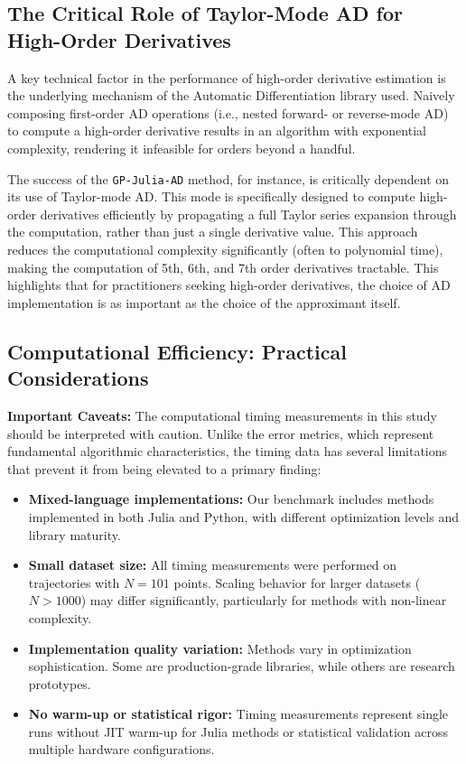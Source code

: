 \subsection{The Critical Role of Taylor-Mode AD for High-Order Derivatives}
A key technical factor in the performance of high-order derivative estimation is the underlying mechanism of the Automatic Differentiation library used. Naively composing first-order AD operations (i.e., nested forward- or reverse-mode AD) to compute a high-order derivative results in an algorithm with exponential complexity, rendering it infeasible for orders beyond a handful.

The success of the \texttt{GP-Julia-AD} method, for instance, is critically dependent on its use of Taylor-mode AD. This mode is specifically designed to compute high-order derivatives efficiently by propagating a full Taylor series expansion through the computation, rather than just a single derivative value. This approach reduces the computational complexity significantly (often to polynomial time), making the computation of 5th, 6th, and 7th order derivatives tractable. This highlights that for practitioners seeking high-order derivatives, the choice of AD implementation is as important as the choice of the approximant itself.

\subsection{Computational Efficiency: Practical Considerations}
\label{sec:efficiency}

\textbf{Important Caveats:} The computational timing measurements in this study should be interpreted with caution. Unlike the error metrics, which represent fundamental algorithmic characteristics, the timing data has several limitations that prevent it from being elevated to a primary finding:

\begin{itemize}
    \item \textbf{Mixed-language implementations:} Our benchmark includes methods implemented in both Julia and Python, with different optimization levels and library maturity.
    \item \textbf{Small dataset size:} All timing measurements were performed on trajectories with $N=101$ points. Scaling behavior for larger datasets ($N > 1000$) may differ significantly, particularly for methods with non-linear complexity.
    \item \textbf{Implementation quality variation:} Methods vary in optimization sophistication. Some are production-grade libraries, while others are research prototypes.
    \item \textbf{No warm-up or statistical rigor:} Timing measurements represent single runs without JIT warm-up for Julia methods or statistical validation across multiple hardware configurations.
\end{itemize}

